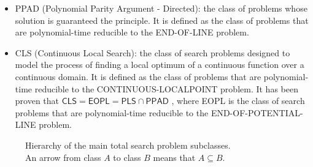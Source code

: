 \begin{itemize}
    \item \textsf{PPAD} (Polynomial Parity Argument - Directed): the class of problems whose solution is guaranteed the  principle. It is defined as the class of problems that are polynomial-time reducible to the END-OF-LINE problem.
    
    \item \textsf{CLS} (Continuous Local Search): the class of search problems designed to model the process of finding a local optimum of a continuous function over a continuous domain. It is defined as the class of problems that are polynomial-time reducible to the CONTINUOUS-LOCALPOINT problem. It has been proven that $\mathsf{CLS} = \mathsf{EOPL} = \mathsf{PLS} \cap \mathsf{PPAD}$ \cite{gradient_descent, Further_collapses_TFNP}, where \textsf{EOPL} is the class of search problems that are polynomial-time reducible to the END-OF-POTENTIAL-LINE problem.
\end{itemize}

\newpage

\begin{figure}[H]
    \centering
    
    
    \caption{Hierarchy of the main total search problem subclasses. \\ An arrow from class $A$ to class $B$ means that $A \subseteq B$.}
\end{figure}

